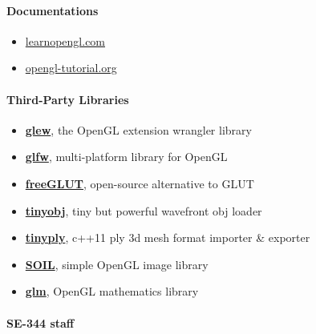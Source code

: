 \documentclass[
]{article}
\begin{document}
\hypertarget{header-n297}{%
\paragraph{Documentations}\label{header-n297}}

\begin{itemize}
\item
  \href{https://learnopengl.com}{learnopengl.com}
\item
  \href{http://www.opengl-tutorial.org}{opengl-tutorial.org}
\end{itemize}

\hypertarget{header-n303}{%
\paragraph{Third-Party Libraries}\label{header-n303}}

\begin{itemize}
\item
  \href{http://glew.sourceforge.net}{\textbf{glew}}, the OpenGL
  extension wrangler library
\item
  \href{https://www.glfw.org}{\textbf{glfw}}, multi-platform library for
  OpenGL
\item
  \href{http://freeglut.sourceforge.net}{\textbf{freeGLUT}}, open-source
  alternative to GLUT
\item
  \href{https://github.com/syoyo/tinyobjloader/}{\textbf{tinyobj}}, tiny
  but powerful wavefront obj loader
\item
  \href{https://github.com/ddiakopoulos/tinyply}{\textbf{tinyply}},
  c++11 ply 3d mesh format importer \& exporter
\item
  \href{https://github.com/paralin/soil}{\textbf{SOIL}}, simple OpenGL
  image library
\item
  \href{https://glm.g-truc.net}{\textbf{glm}}, OpenGL mathematics
  library 
\end{itemize}

\hypertarget{header-n319}{%
\paragraph{SE-344 staff}\label{header-n319}}
\end{document}
